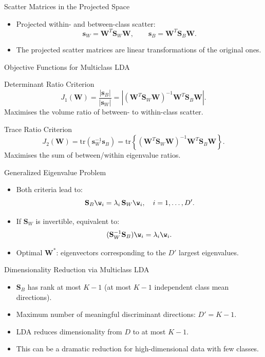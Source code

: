 \begin{frame}{Scatter Matrices in the Projected Space}
  \begin{itemize}
    \item Projected within- and between-class scatter:
    \[
      \mathbf{s}_W = \mathbf{W}^T\mathbf{S}_W\mathbf{W}, \qquad
      \mathbf{s}_B = \mathbf{W}^T\mathbf{S}_B\mathbf{W}.
    \]
    \item The projected scatter matrices are \alert{linear transformations} of the original ones.
  \end{itemize}
\end{frame}

\begin{frame}{Objective Functions for Multiclass LDA}
  \begin{block}{Determinant Ratio Criterion}
    \[
      J_1(\mathbf{W}) = \frac{|\mathbf{s}_B|}{|\mathbf{s}_W|}
      = |(\mathbf{W}^T\mathbf{S}_W\mathbf{W})^{-1}\mathbf{W}^T\mathbf{S}_B\mathbf{W}|.
    \]
    Maximises the volume ratio of between- to within-class scatter.
  \end{block}
  \vspace{0.5em}
  \begin{block}{Trace Ratio Criterion}
    \[
      J_2(\mathbf{W}) = \mathrm{tr}(\mathbf{s}_W^{-1}\mathbf{s}_B)
      = \mathrm{tr}\!\left\{(\mathbf{W}^T\mathbf{S}_W\mathbf{W})^{-1}\mathbf{W}^T\mathbf{S}_B\mathbf{W}\right\}.
    \]
    Maximises the sum of between/within eigenvalue ratios.
  \end{block}
\end{frame}

\begin{frame}{Generalized Eigenvalue Problem}
  \begin{itemize}
    \item Both criteria lead to:
    \[
      \mathbf{S}_B\w_i = \lambda_i\,\mathbf{S}_W\w_i, \quad i = 1,\ldots,D'.
    \]
    \item If $\mathbf{S}_W$ is invertible, equivalent to:
    \[
      (\mathbf{S}_W^{-1}\mathbf{S}_B)\w_i = \lambda_i\w_i.
    \]
    \item Optimal $\mathbf{W}^*$: eigenvectors corresponding to the $D'$ \alert{largest eigenvalues}.
  \end{itemize}
\end{frame}

\begin{frame}{Dimensionality Reduction via Multiclass LDA}
  \begin{itemize}
    \item $\mathbf{S}_B$ has rank at most $K-1$ (at most $K-1$ independent class mean directions).
    \item Maximum number of meaningful discriminant directions: \alert{$D' = K-1$}.
    \item LDA reduces dimensionality from $D$ to \alert{at most $K-1$}.
    \item This can be a dramatic reduction for high-dimensional data with few classes.
  \end{itemize}
\end{frame}


